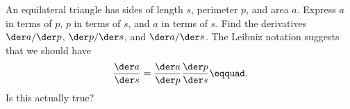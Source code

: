 An equilateral triangle has sides of length $s$, perimeter $p$, and area $a$.
Express $a$ in terms of $p$,
$p$ in terms of $s$, and
$a$ in terms of $s$.
Find the derivatives $\der a/\der p$, $\der p/\der s$, and $\der a/\der s$.
The Leibniz notation suggests that we should have
\begin{equation*}
  \frac{\der a}{\der s} = \frac{\der a}{\der p}  \frac{\der p}{\der s}\eqquad.
\end{equation*}
Is this actually true?
